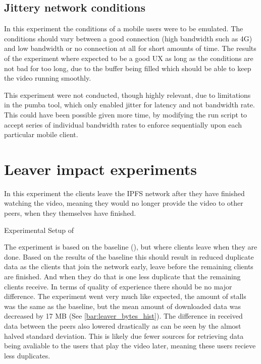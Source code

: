 \if{}

\fi

\subsection{Jittery network conditions}
In this experiment the conditions of a mobile users were to be emulated. The conditions should vary between a good connection (high bandwidth such as 4G) and low bandwidth or no connection at all for short amounts of time.
The results of the experiment where expected to be a good \ac{UX} as long as the conditions are not bad for too long, due to the buffer being filled which should be able to keep the video running smoothly.

This experiment were not conducted, though highly relevant, due to limitations in the pumba tool, which only enabled jitter for latency and not bandwidth rate.
This could have been possible given more time, \eg by modifying the run script to accept series of individual bandwidth rates to enforce sequentially upon each particular mobile client.

\FloatBarrier \section{Leaver impact experiments} %
\label{sec:eval_leaver}
In this experiment the clients  leave the \ac{IPFS} network after they have finished watching the video, meaning they would no longer provide the video to other peers, when they themselves have finished.

\begin{table}[!htbp]
    \myfloatalign
    \caption[Experimental Setup of Leaver]{Experimental Setup of }
    \label{tab:exp_overview_leaver}
    
\end{table}

The experiment is based on the baseline (), but where clients leave when they are done. Based on the results of the baseline this should result in reduced duplicate data as the clients that join the network early, leave before the remaining clients are finished. And when they do that is one less duplicate that the remaining clients receive. In terms of quality of experience there should be no major difference.
The experiment went very much like expected, the amount of stalls was the same as the baseline, but the mean amount of downloaded data was decreased by 17 \ac{MB} (See \autoref{bar:leaver_bytes_hist}). The difference in received data between the peers also lowered drastically as can be seen by the almost halved standard deviation. This is likely due fewer sources for retrieving data being avaliable to the users that play the video later, meaning these users recieve less duplicates.

